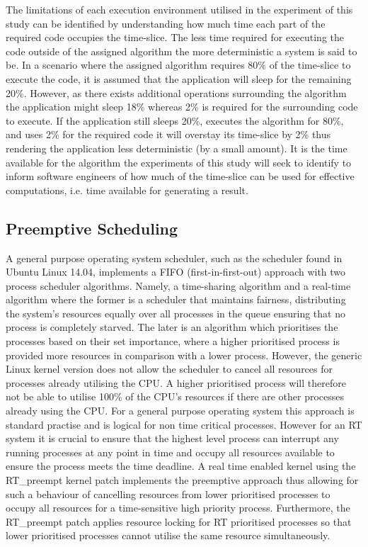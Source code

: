 The limitations of each execution environment utilised in the experiment of this study can be identified by understanding how much time each part of the required code occupies the time-slice. The less time required for executing the code outside of the assigned algorithm the more deterministic a system is said to be. In a scenario where the assigned algorithm requires 80\% of the time-slice to execute the code, it is assumed that the application will sleep for the remaining 20\%. However, as there exists additional operations surrounding the algorithm the application might sleep 18\% whereas 2\% is required for the surrounding code to execute. If the application still sleeps 20\%, executes the algorithm for 80\%, and uses 2\% for the required code it will overstay its time-slice by 2\% thus rendering the application less deterministic (by a small amount). It is the time available for the algorithm the experiments of this study will seek to identify to inform software engineers of how much of the time-slice can be used for effective computations, i.e. time available for generating a result.

\subsection{Preemptive Scheduling}
A general purpose operating system scheduler, such as the scheduler found in Ubuntu Linux 14.04, implements a FIFO (first-in-first-out) approach with two process scheduler algorithms. Namely, a time-sharing algorithm and a real-time algorithm where the former is a scheduler that maintains fairness, distributing the system's resources equally over all processes in the queue ensuring that no process is completely starved. The later is an algorithm which prioritises the processes based on their set importance, where a higher prioritised process is provided more resources in comparison with a lower process. However, the generic Linux kernel version does not allow the scheduler to cancel all resources for processes already utilising the CPU. A higher prioritised process will therefore not be able to utilise 100\% of the CPU's resources if there are other processes already using the CPU. For a general purpose operating system this approach is standard practise and is logical for non time critical processes. However for an RT system it is crucial to ensure that the highest level process can interrupt any running processes at any point in time and occupy all resources available to ensure the process meets the time deadline. A real time enabled kernel using the RT\_preempt kernel patch implements the preemptive approach thus allowing for such a behaviour of cancelling resources from lower prioritised processes to occupy all resources for a time-sensitive high priority process. Furthermore, the RT\_preempt patch applies resource locking for RT prioritised processes so that lower prioritised processes cannot utilise the same resource simultaneously.

